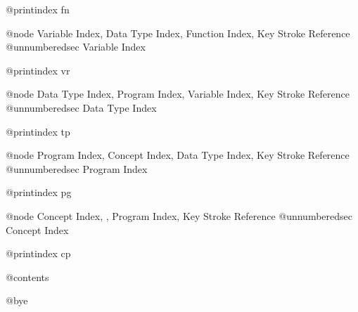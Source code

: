 @printindex fn

@node Variable Index, Data Type Index, Function Index, Key Stroke Reference
@unnumberedsec Variable Index

@printindex vr

@node Data Type Index, Program Index, Variable Index, Key Stroke Reference
@unnumberedsec Data Type Index

@printindex tp

@node Program Index, Concept Index, Data Type Index, Key Stroke Reference
@unnumberedsec Program Index

@printindex pg

@node Concept Index,  , Program Index, Key Stroke Reference
@unnumberedsec Concept Index

@printindex cp


@contents

@bye
                                   

